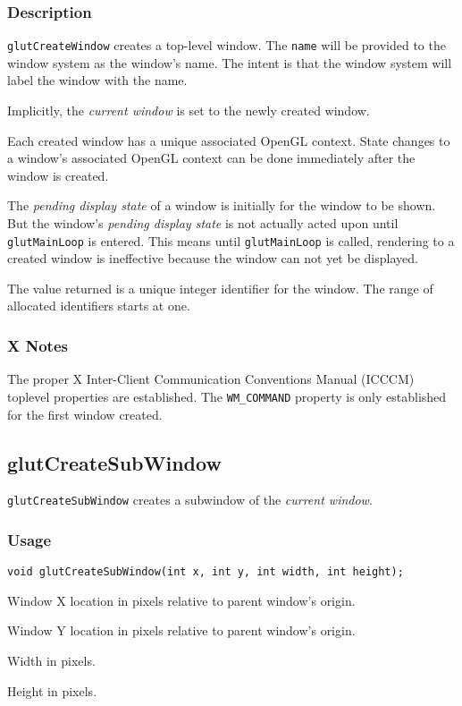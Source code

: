 \subsubsection*{Description}
{\tt glutCreateWindow} creates a top-level window.  The {\tt name} will
be provided to the window system as the window's name.  The intent is that the
window system will label the window with the name.

Implicitly, the {\em current window} is set to the newly created window.

Each created window has a unique associated OpenGL context.  State changes to
a window's associated OpenGL context can be done immediately after the
window is created.

The {\em pending display state} of a window is initially for the window
to be shown.  But the window's {\em pending display state} is not actually
acted upon until {\tt glutMainLoop} is entered.  This means until {\tt glutMainLoop}
is called, rendering to a created window is ineffective because the window
can not yet be displayed.

The value returned is a unique integer identifier for the window.  The
range of allocated identifiers starts at one.

\subsubsection*{X Notes}

The proper X Inter-Client Communication Conventions Manual (ICCCM)
toplevel properties are established.
The {\tt WM\_COMMAND} property is only established for the first window created.

\subsection{glutCreateSubWindow}

{\tt glutCreateSubWindow} creates a subwindow of the {\em current window}.

\subsubsection*{Usage}
\begin{verbatim}
void glutCreateSubWindow(int x, int y, int width, int height);
\end{verbatim}
\begin{description}
\itemsep 0in
\item[\tt x]
Window X location in pixels relative to parent window's origin.
\item[\tt y]
Window Y location in pixels relative to parent window's origin.
\item[\tt width]
Width in pixels.
\item[\tt height]
Height in pixels.
\end{description}

